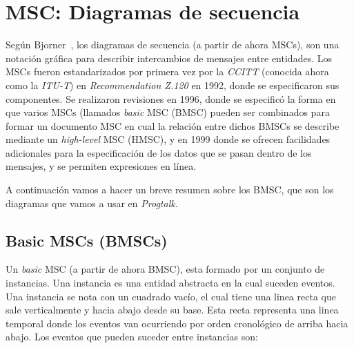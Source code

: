 \chapter{MSC: Diagramas de secuencia}
\label{ch:msc}

Según Bjorner~\cite{bjorner}, los diagramas de secuencia (a partir de
ahora MSCs), son una notación gráfica para describir intercambios de
mensajes entre entidades. Los MSCs fueron estandarizados por primera
vez por la \textit{CCITT} (conocida ahora como la \textit{ITU-T}) en
\textit{Recommendation Z.120} en 1992, donde se especificaron sus
componentes. Se realizaron revisiones en 1996, donde se especificó la
forma en que varios MSCs (llamados \textit{basic} MSC (BMSC) pueden
ser combinados para formar un documento MSC en cual la relación entre
dichos BMSCs se describe mediante un \textit{high-level} MSC (HMSC), y
en 1999 donde se ofrecen facilidades adicionales para la
especificación de los datos que se pasan dentro de los mensajes, y se
permiten expresiones en línea.

A continuación vamos a hacer un breve resumen sobre los BMSC, que son
los diagramas que vamos a usar en \textit{Progtalk}.

\section{Basic MSCs (BMSCs)}
Un \textit{basic} MSC (a partir de ahora BMSC), esta formado por un
conjunto de instancias. Una instancia es una entidad abstracta en la
cual suceden eventos. Una instancia se nota con un cuadrado vacío, el
cual tiene una linea recta que sale verticalmente y hacia abajo desde
su base. Esta recta representa una linea temporal donde los eventos
van ocurriendo por orden cronológico de arriba hacia abajo. Los
eventos que pueden suceder entre instancias son:

